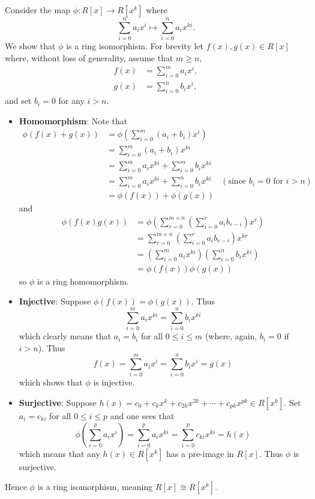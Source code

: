 \begin{questions}
    \item Consider the map $\phi: R[x] \to R[x^k]$ where
    \[
        \sum_{i=0}^n a_ix^i \mapsto \sum_{i=0}^na_ix^{ki}.
    \]
    We show that $\phi$ is a ring isomorphism. For brevity let $f(x), g(x) \in R[x]$ where, without loss of generality, assume that $m \geq n$,
    \begin{align*}
        f(x) &= \sum_{i=0}^m a_ix^i,\\
        g(x) &= \sum_{i=0}^n b_ix^i,
    \end{align*}
    and set $b_i = 0$ for any $i > n$.
    \begin{itemize}
        \item \textbf{Homomorphism}: Note that
        \begin{align*}
            \phi(f(x) + g(x)) &= \phi\left(\sum_{i=0}^m(a_i+b_i)x^i\right)\\
            &= \sum_{i=0}^m(a_i+b_i)x^{ki}\\
            &= \sum_{i=0}^ma_ix^{ki} + \sum_{i=0}^mb_ix^{ki}\\
            &= \sum_{i=0}^ma_ix^{ki} + \sum_{i=0}^nb_ix^{ki} & (\text{since } b_i = 0 \text{ for } i > n)\\
            &= \phi(f(x)) + \phi(g(x))
        \end{align*}
        and
        \begin{align*}
            \phi(f(x)g(x)) &= \phi\left(\sum_{r=0}^{m+n}\left(\sum_{i=0}^ra_ib_{r-i}\right)x^r\right)\\
            &= \sum_{r=0}^{m+n}\left(\sum_{i=0}^ra_ib_{r-i}\right)x^{kr}\\
            &= \left(\sum_{i=0}^ma_ix^{ki}\right)\left(\sum_{i=0}^nb_ix^{ki}\right)\\
            &= \phi(f(x))\phi(g(x))
        \end{align*}
        so $\phi$ is a ring homomorphism.

        \item \textbf{Injective}: Suppose $\phi(f(x)) = \phi(g(x))$. Thus
        \[
            \sum_{i=0}^m a_ix^{ki} = \sum_{i=0}^n b_ix^{ki}
        \]
        which clearly means that $a_i = b_i$ for all $0 \leq i \leq m$ (where, again, $b_i = 0$ if $i > n$). Thus
        \[
            f(x) = \sum_{i=0}^m a_ix^i = \sum_{i=0}^n b_ix^i = g(x)
        \]
        which shows that $\phi$ is injective.

        \item \textbf{Surjective}: Suppose $h(x) = c_0 + c_kx^k + c_{2k}x^{2k} + \cdots + c_{pk}x^{pk} \in R[x^k]$. Set $a_i = c_{ki}$ for all $0 \leq i \leq p$ and one sees that
        \[
            \phi\left(\sum_{i=0}^pa_ix^i\right) = \sum_{i=0}^pa_ix^{ki} = \sum_{i=0}^pc_{ki}x^{ki} = h(x)
        \]
        which means that any $h(x) \in R[x^k]$ has a pre-image in $R[x]$. Thus $\phi$ is surjective.
    \end{itemize}
    Hence $\phi$ is a ring isomorphism, meaning $R[x] \cong R[x^k]$.


\end{questions}
